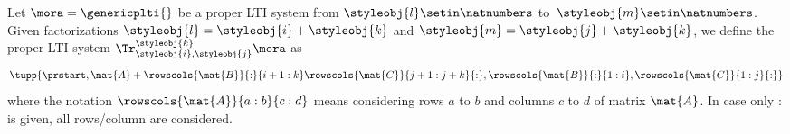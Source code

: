 %

\begin{definition}\label{def:trace-lti-prop}
    Let $\mora = \genericplti{}$ be a proper LTI system from $\styleobj{l}\setin \natnumbers$ to~$\styleobj{m}\setin \natnumbers$.
    Given factorizations $\styleobj{l} = \styleobj{i} + \styleobj{k}$ and $\styleobj{m} = \styleobj{j} + \styleobj{k}$, we define the proper LTI system $\Tr_{\styleobj{i},\styleobj{j}}^{\styleobj{k}}\mora$ as
    \begin{equation}
        \tupp{\prstart,\mat{A} + \rowscols{\mat{B}}{:}{i+1:k}\rowscols{\mat{C}}{j+1:j+k}{:},\rowscols{\mat{B}}{:}{1:i},\rowscols{\mat{C}}{1:j}{:}}
    \end{equation}
    where the notation $\rowscols{\mat{A}}{a:b}{c:d}$ means considering rows $a$ to $b$ and columns $c$ to $d$ of matrix $\mat{A}$.
    In case only $:$ is given, all rows/column are considered.
\end{definition}

